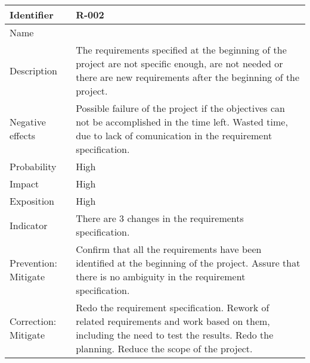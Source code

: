 \begin{table}[H]
	\begin{tabularx}{\textwidth}{|y|z|}
		\hline
		Identifier & \textbf{R-002} \\ \hline
		Name & \Rdos \\ \hline
		Description &
			The requirements specified at the beginning of the project are not specific enough, are not needed or there are new requirements after the beginning of the project.
		\\ \hline
		Negative effects &
			Possible failure of the project if the objectives can not be accomplished in the time left. \linej
			Wasted time, due to lack of comunication in the requirement specification.
		\\ \hline
		Probability & High\\ \hline
		Impact &  High\\ \hline
		Exposition &  High\\ \hline
		Indicator & There are 3 changes in the requirements specification.\\ \hline
		Prevention: Mitigate &
			Confirm that all the requirements have been identified at the beginning of the project.\linej
			Assure that there is no ambiguity in the requirement specification.
		\\ \hline
		Correction: Mitigate &
			Redo the requirement specification. \linej
			Rework of related requirements and work based on them, including the need to test the results. \linej
			Redo the planning.  \linej
			Reduce the scope of the project.
		\\ \hline
	\end{tabularx}
\end{table}

